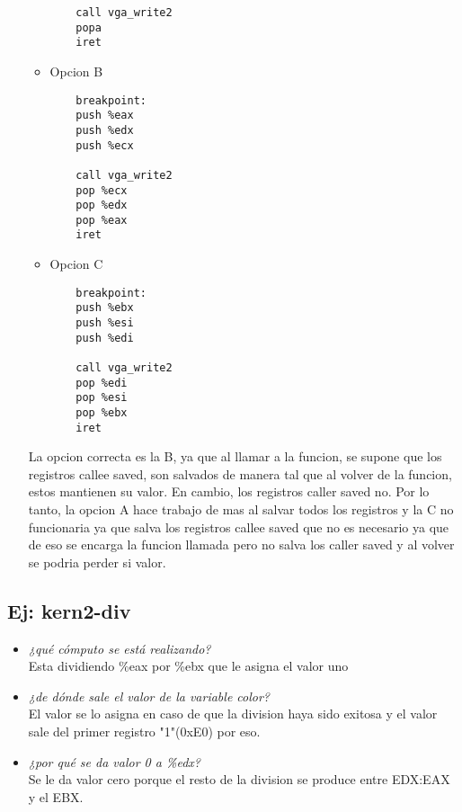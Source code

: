 \documentclass[a4paper, 12pt]{article}
\begin{document}
\begin{itemize}
\begin{itemize}
\begin{lstlisting}
	call vga_write2
	popa
	iret
\end{lstlisting}
					\item Opcion B
\begin{lstlisting}
	breakpoint:
	push %eax
	push %edx
	push %ecx

	call vga_write2
	pop %ecx
	pop %edx
	pop %eax
	iret
\end{lstlisting}
					\item Opcion C
\begin{lstlisting}
	breakpoint:
	push %ebx
	push %esi
	push %edi

	call vga_write2
	pop %edi
	pop %esi
	pop %ebx
	iret
\end{lstlisting}
\end{itemize}
					La opcion correcta es la B, ya que al llamar a la funcion,
					se supone que los registros callee saved, son salvados de
					manera tal que al volver de la funcion, estos mantienen
					su valor. En cambio, los registros caller saved no. Por lo
					tanto, la opcion A hace trabajo de mas al salvar todos los
					registros y la C no funcionaria ya que salva los registros
					callee saved que no es necesario ya que de eso se encarga la
					funcion llamada pero no salva los caller saved y al volver
					se podria perder si valor.\\
			\end{itemize}
		\subsection{Ej: kern2-div}
		\begin{itemize}
			Explicar el funcionamiento exacto de la línea asm(\ldots):\\
\begin{lstlisting}
	void kmain(const multiboot_info_t *mbi) {
	int8_t linea;
	uint8_t color;

	// ...

	idt_init();
	irq_init();

	asm("div %4"
	: "=a"(linea), "=c"(color)
	: "0"(18), "1"(0xE0), "b"(1), "d"(0));

	vga_write2("Funciona vga_write2?", linea, color);
	}

\end{lstlisting}
			\item \textit{¿qué cómputo se está realizando?\\}
			Esta dividiendo \%eax por \%ebx que le asigna el valor uno\\
			\item \textit{¿de dónde sale el valor de la variable color?\\}
			El valor se lo asigna en caso de que la division haya sido exitosa
			y el valor sale del primer registro "1"(0xE0) por eso.\\
			\item \textit{¿por qué se da valor 0 a \%edx?\\}
			Se le da valor cero porque el resto de la division se produce entre
			EDX:EAX y el EBX.\\
		\end{itemize}
\end{document}
